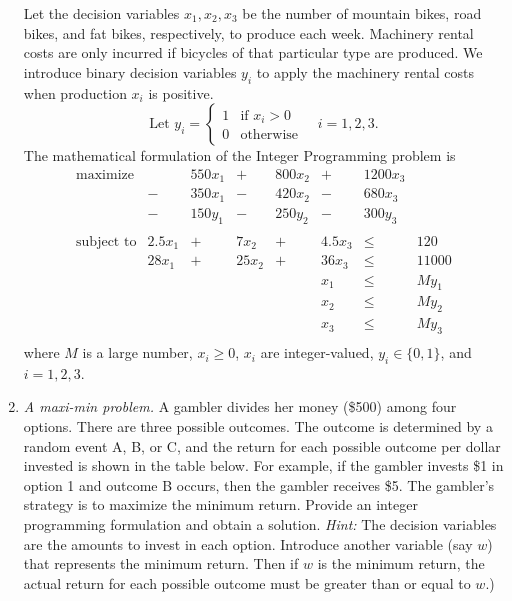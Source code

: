 \begin{enumerate}
\begin{solution}
  \bs Let the decision variables $x_1,x_2,x_3$ be the number of
  mountain bikes, road bikes, and fat bikes, respectively, to produce
  each week. Machinery rental costs are only incurred if bicycles of that
  particular type are produced. We introduce binary decision variables
  $y_i$ to apply the machinery rental costs when production $x_i$ is
  positive.
\[
\text{Let $y_i$} = 
\begin{cases}
1 & \text{if $x_i > 0$} \\
0 & \text{otherwise}
\end{cases}
\quad i = 1,2,3.
\]
The mathematical formulation of the Integer Programming problem is
\[
\begin{array}{lrrrrrrl}
\textrm{maximize} &   & 550x_1 & + & 800x_2 & + & \num{1200}x_3 & \\
& - & 350x_1  & - & 420x_2 & - & 680x_3  & \\
& - & 150y_1& - & 250y_2&- & 300y_3& \\
& & & & & & &\\
\textrm{subject to} & 2.5x_1 & + & 7x_2 & + & 4.5x_3 & \leq & 120 \\
& 28x_1 & + & 25x_2 & + & 36x_3 & \leq & \num{11000} \\
& & & & & x_1 & \leq & My_1 \\
& & & & & x_2 & \leq & My_2 \\
& & & & & x_3 & \leq & My_3 \\
\end{array}
\]
where $M$ is a large number, $x_i \geq 0$, $x_i$ are integer-valued, 
$y_i \in \{0,1\}$, and $i = 1,2,3$.
\end{solution}

\item \emph{A maxi-min problem.}  A gambler divides her money (\$500)
  among four options.  There are three possible outcomes. The outcome
  is determined by a random event A, B, or C, and the return for each
  possible outcome per dollar invested is shown in the table
  below. For example, if the gambler invests \$1 in option 1 and
  outcome B occurs, then the gambler receives \$5. The gambler's
  strategy is to maximize the minimum return. Provide an integer
  programming formulation and obtain a solution.  \emph{Hint:} The
  decision variables are the amounts to invest in each
  option. Introduce another variable (say $w$) that represents the
  minimum return. Then if $w$ is the minimum return, the actual return
  for each possible outcome must be greater than or equal to $w$.)


\end{enumerate}
